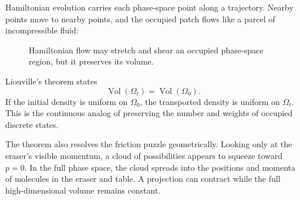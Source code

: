 Hamiltonian evolution carries each phase-space point along a trajectory.
Nearby points move to nearby points, and the occupied patch flows like a
parcel of incompressible fluid:
\begin{figure}[htbp]
\centering
{}
\caption{Hamiltonian flow may stretch and shear an occupied phase-space
region, but it preserves its volume.}
\label{fig:sm1-liouville-flow}
\end{figure}

Liouville's theorem states
\begin{equation}
 \operatorname{Vol}(\Omega_t)
 =
 \operatorname{Vol}(\Omega_0).
 \label{eq:sm1-liouville-volume}
\end{equation}
If the initial density is uniform on \(\Omega_0\), the transported density is
uniform on \(\Omega_t\). This is the continuous analog of preserving the
number and weights of occupied discrete states.

The theorem also resolves the friction puzzle geometrically. Looking only at
the eraser's visible momentum, a cloud of possibilities appears to squeeze
toward \(p=0\). In the full phase space, the cloud spreads into the positions
and momenta of molecules in the eraser and table. A projection can contract
while the full high-dimensional volume remains constant.

\begin{classroomqa}
\end{classroomqa}

